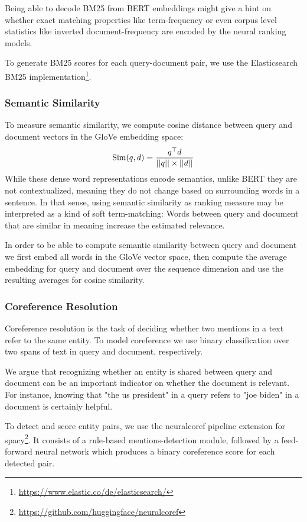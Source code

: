 Being able to decode BM25 from BERT embeddings might give a hint on whether exact matching properties like term-frequency or even corpus level statistics like inverted document-frequency are encoded by the neural ranking models.

To generate BM25 scores for each query-document pair, we use the Elasticsearch BM25 implementation\footnote{\url{https://www.elastic.co/de/elasticsearch/}}.

\subsubsection{Semantic Similarity}
To measure semantic similarity, we compute cosine distance between query and document vectors in the GloVe\cite{pennington2014glove} embedding space:
\begin{equation}
    \label{eq:sem_sim}
    \text{Sim}(q, d) = \frac{q^\top d}{||q|| \times ||d||}
\end{equation}
While these dense word representations encode semantics, unlike BERT they are not contextualized, meaning they do not change based on surrounding words in a sentence. In that sense, using semantic similarity as ranking measure may be interpreted as a kind of soft term-matching: Words between query and document that are similar in meaning increase the estimated relevance.

In order to be able to compute semantic similarity between query and document we first embed all words in the GloVe \cite{pennington2014glove} vector space, then compute the average embedding for query and document over the sequence dimension and use the resulting averages for cosine similarity.

\subsubsection{Coreference Resolution}
Coreference resolution is the task of deciding whether two mentions in a text refer to the same entity. To model coreference we use binary classification over two spans of text in query and document, respectively.

We argue that recognizing whether an entity is shared between query and document can be an important indicator on whether the document is relevant. For instance, knowing that "the us president" in a query refers to "joe biden" in a document is certainly helpful.

To detect and score entity pairs, we use the neuralcoref pipeline extension for spacy\footnote{\url{https://github.com/huggingface/neuralcoref}}. It consists of a rule-based mentions-detection module, followed by a feed-forward neural network which produces a binary coreference score for each detected pair.

